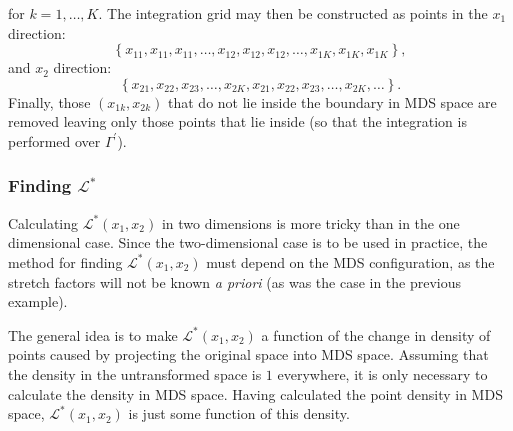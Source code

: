 for $k=1,\dots,K$. The integration grid may then be constructed as points in the $x_1$ direction:
\begin{equation*}
\left \{x_{11},x_{11},x_{11},\dots, x_{12}, x_{12}, x_{12},\dots, x_{1K}, x_{1K}, x_{1K}\right \},
\end{equation*}
and $x_2$ direction:
\begin{equation*}
\left \{x_{21},x_{22}, x_{23},\dots, x_{2K},x_{21},x_{22}, x_{23},\dots, x_{2K},\dots\right \}.
\end{equation*}
Finally, those $(x_{1k},x_{2k})$ that do not lie inside the boundary in MDS space are removed leaving only those points that lie inside (so that the integration is performed over $\Gamma^\prime$).

\subsubsection{Finding $\mathcal{L}^*$}

Calculating $\mathcal{L}^*(x_1,x_2)$ in two dimensions is more tricky than in the one dimensional case. Since the two-dimensional case is to be used in practice, the method for finding $\mathcal{L}^*(x_1,x_2)$ must depend on the MDS configuration, as the stretch factors will not be known \emph{a priori} (as was the case in the previous example).

The general idea is to make $\mathcal{L}^*(x_1,x_2)$ a function of the change in density of points caused by projecting the original space into MDS space. Assuming that the density in the untransformed space is $1$ everywhere, it is only necessary to calculate the density in MDS space. Having calculated the point density in MDS space, $\mathcal{L}^*(x_1,x_2)$ is just some function of this density.

